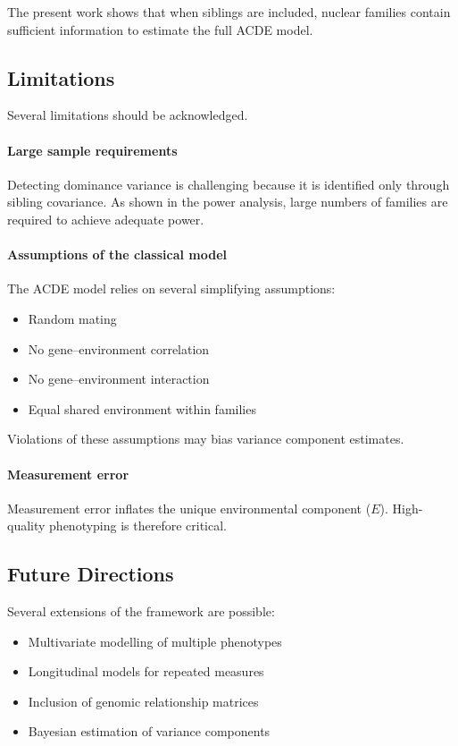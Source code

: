 The present work shows that when siblings are included, nuclear families
contain sufficient information to estimate the full ACDE model.

\subsection{Limitations}

Several limitations should be acknowledged.

\paragraph{Large sample requirements}

Detecting dominance variance is challenging because it is identified only
through sibling covariance. As shown in the power analysis, large numbers
of families are required to achieve adequate power.

\paragraph{Assumptions of the classical model}

The ACDE model relies on several simplifying assumptions:

\begin{itemize}
\item Random mating
\item No gene--environment correlation
\item No gene--environment interaction
\item Equal shared environment within families
\end{itemize}

Violations of these assumptions may bias variance component estimates.

\paragraph{Measurement error}

Measurement error inflates the unique environmental component ($E$).
High-quality phenotyping is therefore critical.

\subsection{Future Directions}

Several extensions of the framework are possible:

\begin{itemize}
\item Multivariate modelling of multiple phenotypes
\item Longitudinal models for repeated measures
\item Inclusion of genomic relationship matrices
\item Bayesian estimation of variance components
\end{itemize}

